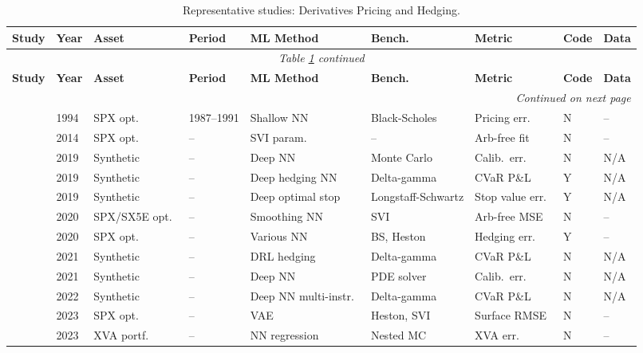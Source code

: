 \begin{longtable}{p{2.4cm} p{0.6cm} p{1.0cm} p{1.0cm} p{2.0cm} p{1.5cm} p{1.3cm} p{0.7cm} p{1.3cm}}
\caption{Representative studies: Derivatives Pricing and Hedging.}\label{tab:master_derivatives} \\
\toprule
\textbf{Study} & \textbf{Year} & \textbf{Asset} & \textbf{Period} & \textbf{ML Method} & \textbf{Bench.} & \textbf{Metric} & \textbf{Code} & \textbf{Data} \\
\midrule
\endfirsthead
\multicolumn{9}{c}{\textit{Table \ref{tab:master_derivatives} continued}} \\
\toprule
\textbf{Study} & \textbf{Year} & \textbf{Asset} & \textbf{Period} & \textbf{ML Method} & \textbf{Bench.} & \textbf{Metric} & \textbf{Code} & \textbf{Data} \\
\midrule
\endhead
\midrule
\multicolumn{9}{r}{\textit{Continued on next page}} \\
\endfoot
\bottomrule
\endlastfoot

\citet{Hutchinson1994} & 1994 & SPX opt.\ & 1987--1991 & Shallow NN       & Black-Scholes & Pricing err.\ & N & --   \\
\citet{Gatheral2014}   & 2014 & SPX opt.\ & --         & SVI param.\      & --            & Arb-free fit  & N & --   \\
\citet{Bayer2019}      & 2019 & Synthetic & --         & Deep NN          & Monte Carlo   & Calib.\ err.\ & N & N/A \\
\citet{Buehler2019}    & 2019 & Synthetic & --         & Deep hedging NN  & Delta-gamma   & CVaR P\&L     & Y & N/A  \\
\citet{Becker2019}     & 2019 & Synthetic & --         & Deep optimal stop& Longstaff-Schwartz & Stop value err.\ & Y & N/A \\
\citet{Ackerer2020}    & 2020 & SPX/SX5E opt.\ & --    & Smoothing NN     & SVI           & Arb-free MSE  & N & --   \\
\citet{Ruf2020}        & 2020 & SPX opt.\ & --         & Various NN       & BS, Heston    & Hedging err.\ & Y & --   \\
\citet{Cao2021}        & 2021 & Synthetic & --         & DRL hedging      & Delta-gamma   & CVaR P\&L     & N & N/A  \\
\citet{Horvath2021}    & 2021 & Synthetic & --         & Deep NN          & PDE solver    & Calib.\ err.\ & N & N/A \\
\citet{Murray2022}     & 2022 & Synthetic & --         & Deep NN multi-instr.\ & Delta-gamma & CVaR P\&L  & N & N/A  \\
\citet{Cohen2023}      & 2023 & SPX opt.\ & --         & VAE              & Heston, SVI   & Surface RMSE  & N & --   \\
\citet{Gnoatto2023}    & 2023 & XVA portf.\ & --       & NN regression    & Nested MC     & XVA err.\     & N & --   \\

\end{longtable}

